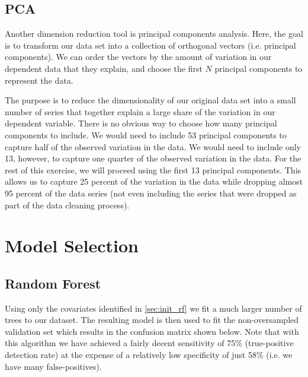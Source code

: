 \documentclass[11pt, fleqn]{article}
\begin{document}
\subsection{PCA}

Another dimension reduction tool is principal components analysis. Here, the goal is to transform our data set into a collection of orthogonal vectors (i.e. principal components). We can order the vectors by the amount of variation in our dependent data that they explain, and choose the first $N$ principal components to represent the data.

The purpose is to reduce the dimensionality of our original data set into a small number of series that together explain a large share of the variation in our dependent variable. There is no obvious way to choose how many principal components to include. We would need to include 53 principal components to capture half of the observed variation in the data. We would need to include only 13, however, to capture one quarter of the observed variation in the data. For the rest of this exercise, we will proceed using the first 13 principal components. This allows us to capture 25 percent of the variation in the data while dropping almost 95 percent of the data series (not even including the series that were dropped as part of the data cleaning process). 

\section{Model Selection}
\subsection{Random Forest}\label{sec:mod_rf}
Using only the covariates identified in \cref{sec:init_rf} we fit a much larger number of trees to our dataset.  The resulting model is then used to fit the non-oversampled validation set which results in the confusion matrix shown below.  Note that with this algorithm we have achieved a fairly decent sensitivity of 75\% (true-positive detection rate) at the expense of a relatively low specificity of just 58\% (i.e. we have many false-positives).
\end{document}
